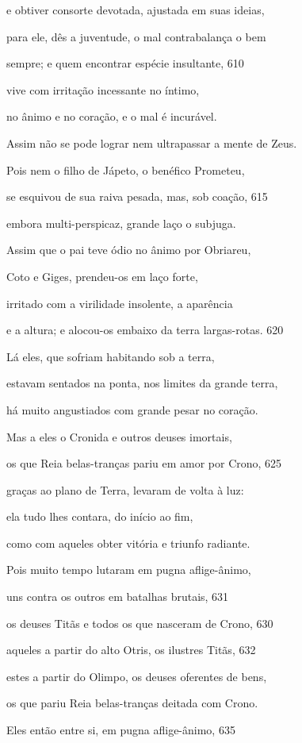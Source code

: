 e obtiver consorte devotada, ajustada em suas ideias,

para ele, dês a juventude, o mal contrabalança o bem

sempre; e quem encontrar espécie insultante, \num{610}

vive com irritação incessante no íntimo,

no ânimo e no coração, e o mal é incurável.

\quad{}Assim não se pode lograr nem ultrapassar a mente de Zeus.

Pois nem o filho de Jápeto, o benéfico Prometeu,

se esquivou de sua raiva pesada, mas, sob coação, \num{615}

embora multi-perspicaz, grande laço o subjuga.

\medskip

Assim que o pai teve ódio no ânimo por Obriareu,

Coto e Giges, prendeu-os em laço forte,

irritado com a virilidade insolente, a aparência

e a altura; e alocou-os embaixo da terra largas-rotas. \num{620}

Lá eles, que sofriam habitando sob a terra,

estavam sentados na ponta, nos limites da grande terra,

há muito angustiados com grande pesar no coração.

Mas a eles o Cronida e outros deuses imortais,

os que Reia belas-tranças pariu em amor por Crono, \num{625}

graças ao plano de Terra, levaram de volta à luz:

ela tudo lhes contara, do início ao fim,

como com aqueles obter vitória e triunfo radiante.

Pois muito tempo lutaram em pugna aflige-ânimo,

uns contra os outros em batalhas brutais, \num{631}

os deuses Titãs e todos os que nasceram de Crono, \num{630}

aqueles a partir do alto Otris, os ilustres Titãs, \num{632}

estes a partir do Olimpo, os deuses oferentes de bens,

os que pariu Reia belas-tranças deitada com Crono.

Eles então entre si, em pugna aflige-ânimo, \num{635}

